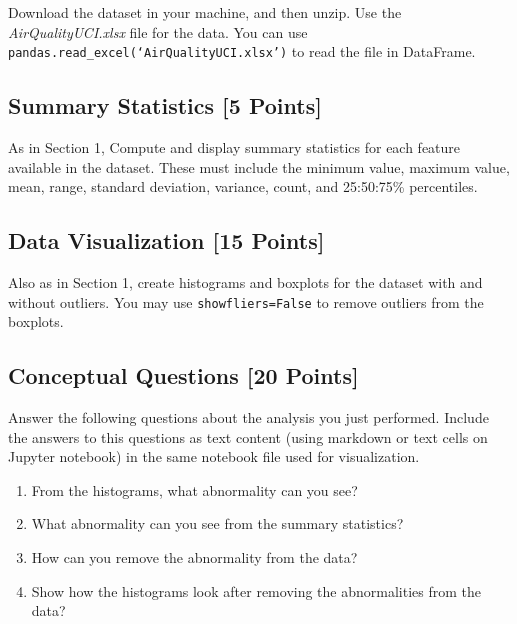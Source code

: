 \documentclass[letter-paper,12pt]{article} %
\begin{document}
Download the dataset in your machine, and then unzip. Use the \textit{AirQualityUCI.xlsx} file for the data. You can use \texttt{pandas.read\_excel(`AirQualityUCI.xlsx')} to read the file in DataFrame. 

\subsection{Summary Statistics [5 Points]}
As in Section 1, Compute and display summary statistics for each feature available in the dataset. These must include the minimum value, maximum value, mean, range, standard deviation, variance, count, and 25:50:75\% percentiles.

\subsection{Data Visualization [15 Points]}
 Also as in Section 1, create histograms and boxplots for the dataset with and without outliers. You may use \texttt{showfliers=False} to remove outliers from the boxplots. 

\subsection{Conceptual Questions [20 Points]}
Answer the following questions about the analysis you just performed. Include the answers to this questions as text content (using markdown or text cells on Jupyter notebook) in the same notebook file used for visualization.
\begin{enumerate}
    \item From the histograms, what abnormality can you see? 
    \item What abnormality can you see from the summary statistics?
    \item How can you remove the abnormality from the data? 
    \item Show how the histograms look after removing the abnormalities from the data?
    
\end{enumerate}
\end{document}
